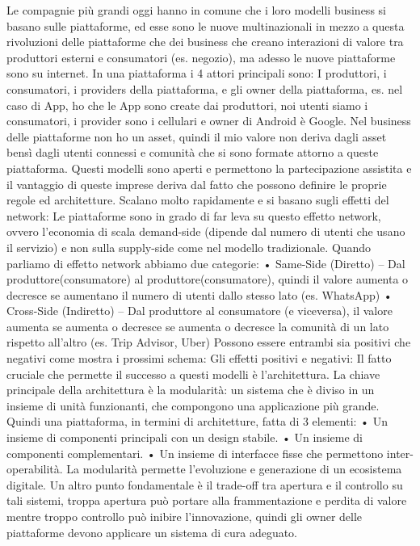 \documentclass[11pt, a4page, twocolumn]{article}
\begin{document}
Le compagnie più grandi oggi hanno in comune che i loro modelli business si basano sulle piattaforme, ed esse sono le nuove multinazionali in mezzo a questa rivoluzioni delle piattaforme che dei business che creano interazioni di valore tra produttori esterni e consumatori (es. negozio), ma adesso le nuove piattaforme sono su internet.
In una piattaforma i 4 attori principali sono: I produttori, i consumatori, i providers della piattaforma, e gli owner della piattaforma, es. nel caso di App, ho che le App sono create dai produttori, noi utenti siamo i consumatori, i provider sono i cellulari e owner di Android è Google.
Nel business delle piattaforme non ho un asset, quindi il mio valore non deriva dagli asset bensì dagli utenti connessi e comunità che si sono formate attorno a queste piattaforma. Questi modelli sono aperti e permettono la partecipazione assistita e il vantaggio di queste imprese deriva dal fatto che possono definire le proprie regole ed architetture. Scalano molto rapidamente e si basano sugli effetti del network: Le piattaforme sono in grado di far leva su questo effetto network, ovvero l’economia di scala demand-side (dipende dal numero di utenti che usano il servizio) e non sulla supply-side come nel modello tradizionale. 
Quando parliamo di effetto network abbiamo due categorie:
    • Same-Side (Diretto) – Dal produttore(consumatore) al produttore(consumatore), quindi il valore aumenta o decresce se aumentano il numero di utenti dallo stesso lato (es. WhatsApp)
    • Cross-Side (Indiretto) – Dal produttore al consumatore (e viceversa), il valore aumenta se aumenta o decresce se aumenta o decresce la comunità di un lato rispetto all’altro (es. Trip Advisor, Uber)
Possono essere entrambi sia positivi che negativi come mostra i prossimi schema:
Gli effetti positivi e negativi:
Il fatto cruciale che permette il successo a questi modelli è l’architettura. La chiave principale della architettura è la modularità: un sistema che è diviso in un insieme di unità funzionanti, che compongono una applicazione più grande.
Quindi una piattaforma, in termini di architetture, fatta di 3 elementi:
    • Un insieme di componenti principali con un design stabile.
    • Un insieme di componenti complementari.
    • Un insieme di interfacce fisse che permettono inter-operabilità.
La modularità permette l’evoluzione e generazione di un ecosistema digitale.
Un altro punto fondamentale è il trade-off tra apertura e il controllo su tali sistemi, troppa apertura può portare alla frammentazione e perdita di valore mentre troppo controllo può inibire l’innovazione, quindi gli owner delle piattaforme devono applicare un sistema di cura adeguato.
\end{document}
